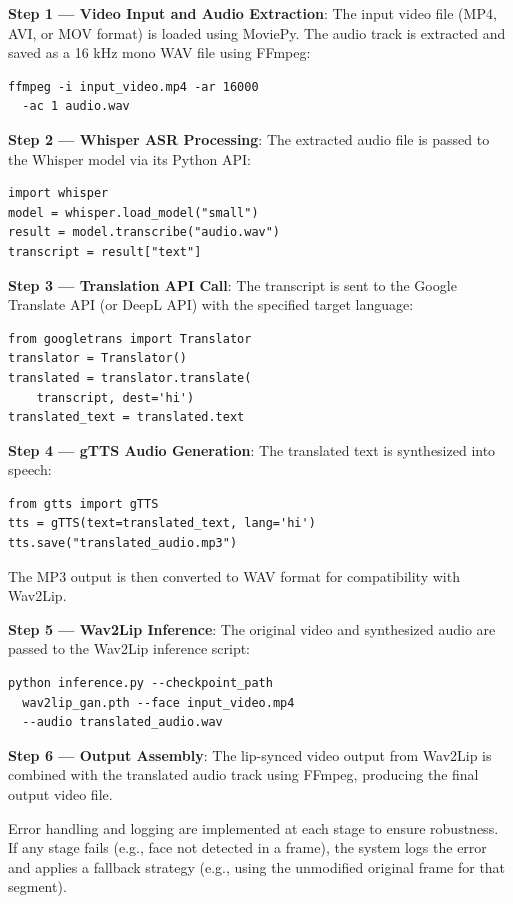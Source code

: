 \documentclass[conference]{IEEEtran}
\begin{document}
\textbf{Step 1 --- Video Input and Audio Extraction}:
The input video file (MP4, AVI, or MOV format) is loaded using MoviePy. The audio track is extracted and saved as a 16 kHz mono WAV file using FFmpeg:
\begin{verbatim}
ffmpeg -i input_video.mp4 -ar 16000 
  -ac 1 audio.wav
\end{verbatim}

\textbf{Step 2 --- Whisper ASR Processing}:
The extracted audio file is passed to the Whisper model via its Python API:
\begin{verbatim}
import whisper
model = whisper.load_model("small")
result = model.transcribe("audio.wav")
transcript = result["text"]
\end{verbatim}

\textbf{Step 3 --- Translation API Call}:
The transcript is sent to the Google Translate API (or DeepL API) with the specified target language:
\begin{verbatim}
from googletrans import Translator
translator = Translator()
translated = translator.translate(
    transcript, dest='hi')
translated_text = translated.text
\end{verbatim}

\textbf{Step 4 --- gTTS Audio Generation}:
The translated text is synthesized into speech:
\begin{verbatim}
from gtts import gTTS
tts = gTTS(text=translated_text, lang='hi')
tts.save("translated_audio.mp3")
\end{verbatim}

The MP3 output is then converted to WAV format for compatibility with Wav2Lip.

\textbf{Step 5 --- Wav2Lip Inference}:
The original video and synthesized audio are passed to the Wav2Lip inference script:
\begin{verbatim}
python inference.py --checkpoint_path 
  wav2lip_gan.pth --face input_video.mp4 
  --audio translated_audio.wav
\end{verbatim}

\textbf{Step 6 --- Output Assembly}:
The lip-synced video output from Wav2Lip is combined with the translated audio track using FFmpeg, producing the final output video file.

Error handling and logging are implemented at each stage to ensure robustness. If any stage fails (e.g., face not detected in a frame), the system logs the error and applies a fallback strategy (e.g., using the unmodified original frame for that segment).
\end{document}
